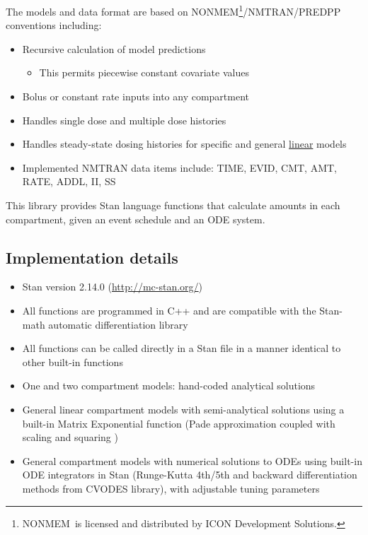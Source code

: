 \documentclass[11pt]{amsart}
\begin{document}
The models and data format are based on NONMEM\textregistered\footnote{NONMEM\textregistered\ is licensed and distributed by ICON Development Solutions.}/NMTRAN/PREDPP conventions including:
\begin{itemize}
  \item Recursive calculation of model predictions
  \begin{itemize}
    \item This permits piecewise constant covariate values
  \end{itemize}
  \item Bolus or constant rate inputs into any compartment
  \item Handles single dose and multiple dose histories
  \item Handles steady-state dosing histories for specific and general \underline{linear} models
  \item Implemented NMTRAN data items include: TIME, EVID, CMT, AMT, RATE, ADDL, II, SS
\end{itemize}

This library provides Stan language functions that calculate amounts in each compartment, given an event schedule and an ODE system.
    
\subsection{Implementation details}
\begin{itemize}
  \item Stan version 2.14.0 (\url{http://mc-stan.org/})
  \item All functions are programmed in C++ and are compatible with the Stan-math automatic differentiation library \cite{AD}
  \item All functions can be called directly in a Stan file in a manner identical to other built-in functions
  \item One and two compartment models: hand-coded analytical solutions
  \item General linear compartment models with semi-analytical solutions using a built-in Matrix Exponential function (Pade approximation coupled with scaling and squaring \cite{matrixExp})
  \item General compartment models with numerical solutions to ODEs using built-in ODE integrators in Stan (Runge-Kutta 4th/5th and backward differentiation methods from CVODES library), with adjustable tuning parameters
\end{itemize}
\end{document}
